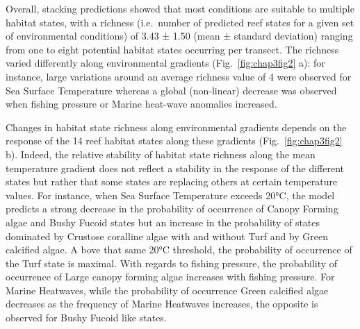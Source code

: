 \begin{refsection}
Overall, stacking predictions showed that most conditions are suitable
to multiple habitat states, with a richness (i.e.~number of predicted
reef states for a given set of environmental conditions) of 3.43 ± 1.50
(mean ± standard deviation) ranging from one to eight potential habitat
states occurring per transect. The richness varied differently along
environmental gradients (Fig.~\ref{fig:chap3fig2} a): for instance,
large variations around an average richness value of 4 were observed for
Sea Surface Temperature whereas a global (non-linear) decrease was
observed when fishing pressure or Marine heat-wave anomalies increased.

Changes in habitat state richness along environmental gradients depends
on the response of the 14 reef habitat states along these gradients
(Fig.~\ref{fig:chap3fig2} b). Indeed, the relative stability of habitat
state richness along the mean temperature gradient does not reflect a
stability in the response of the different states but rather that some
states are replacing others at certain temperature values. For instance,
when Sea Surface Temperature exceeds 20°C, the model predicts a strong
decrease in the probability of occurrence of Canopy Forming algae and
Bushy Fucoid states but an increase in the probability of states
dominated by Crustose coralline algae with and without Turf and by Green
calcified algae. A bove that same 20°C threshold, the probability of
occurrence of the Turf state is maximal. With regards to fishing
pressure, the probability of occurrence of Large canopy forming algae
increases with fishing pressure. For Marine Heatwaves, while the
probability of occurrence Green calcified algae decreases as the
frequency of Marine Heatwaves increases, the opposite is observed for
Bushy Fucoid like states.


\end{refsection}
